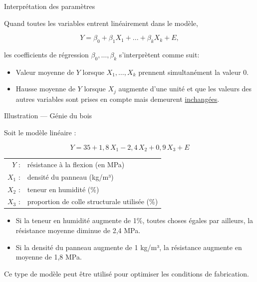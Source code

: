 \documentclass{BeamerTemplate}
\begin{document}
\begin{frame}[t]{Interprétation des paramètres}

{\small
Quand toutes les variables entrent linéairement dans le modèle,

$$Y=\beta_0+\beta_1X_1+...+\beta_kX_k+E,$$

les coefficients de régression $\beta_0,\ldots,\beta_k$ s'interprètent comme suit:
\bigskip

\begin{itemize}\itemsep1cm
\item[$\beta_0$: ] Valeur \alert{moyenne} de $Y$ lorsque $X_1,\ldots,X_k$ prennent \alert{simultanément} la valeur 0.
\item[$\beta_j$: ] Hausse \alert{moyenne} de $Y$ lorsque $X_j$ augmente d'une unité et que les
valeurs des autres variables sont prises en compte mais demeurent \underline{inchangées}.
\end{itemize}
}
\end{frame}



\begin{frame}[t]{Illustration — Génie du bois}

Soit le modèle linéaire :

$$
Y = 35 + 1{,}8\,X_1 - 2{,}4\,X_2 + 0{,}9\,X_3 + E
$$

\vspace{0.4cm}

\begin{tabular}{rl}
$Y$ : & résistance à la flexion (en MPa) \\
$X_1$ : & densité du panneau (kg/m³) \\
$X_2$ : & teneur en humidité (\%) \\
$X_3$ : & proportion de colle structurale utilisée (\%)
\end{tabular}

\vspace{0.4cm}

\begin{itemize}
\item Si la teneur en humidité augmente de 1\%, toutes choses égales par ailleurs, la résistance moyenne \alert{diminue de 2,4 MPa}.
\item Si la densité du panneau augmente de 1 kg/m³, la résistance augmente en moyenne de \alert{1,8 MPa}.
\end{itemize}

\vspace{0.3cm}
{\tiny Ce type de modèle peut être utilisé pour optimiser les conditions de fabrication.}
\end{frame}
\end{document}
